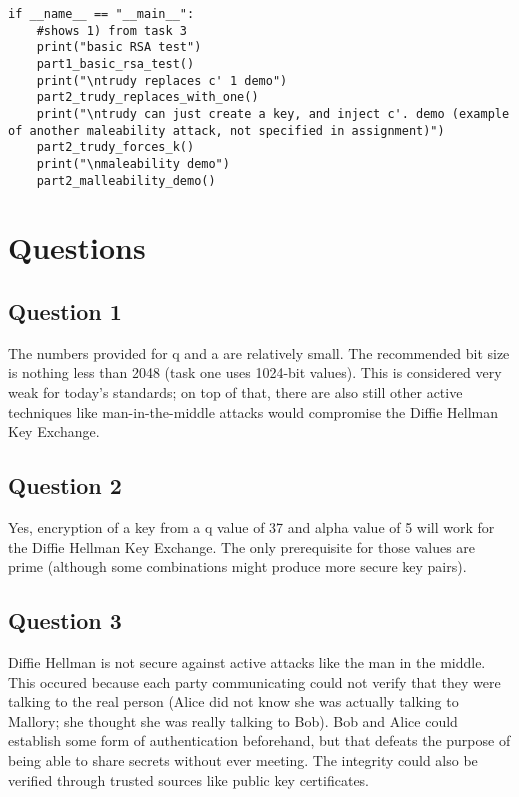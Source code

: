 \documentclass[11pt]{article}
\begin{document}
\begin{lstlisting}
if __name__ == "__main__":
    #shows 1) from task 3
    print("basic RSA test")
    part1_basic_rsa_test()
    print("\ntrudy replaces c' 1 demo")
    part2_trudy_replaces_with_one()
    print("\ntrudy can just create a key, and inject c'. demo (example of another maleability attack, not specified in assignment)")
    part2_trudy_forces_k()
    print("\nmaleability demo")
    part2_malleability_demo()
\end{lstlisting}


\section*{Questions}
\subsection*{Question 1}

The numbers provided for q and a are relatively small. The recommended bit size is nothing less than 2048 (task one uses 1024-bit values). This is considered very weak for today's standards; on top of that, there are also still other active techniques like man-in-the-middle attacks would compromise the Diffie Hellman Key Exchange.

\subsection*{Question 2}

Yes, encryption of a key from a q value of 37 and alpha value of 5 will work for the Diffie Hellman Key Exchange. The only prerequisite for those values are prime (although some combinations might produce more secure key pairs).

\subsection*{Question 3}

Diffie Hellman is not secure against active attacks like the man in the middle. This occured because each party communicating could not verify that they were talking to the real person (Alice did not know she was actually talking to Mallory; she thought she was really talking to Bob). Bob and Alice could establish some form of authentication beforehand, but that defeats the purpose of being able to share secrets without ever meeting. The integrity could also be verified through trusted sources like public key certificates.
\end{document}
